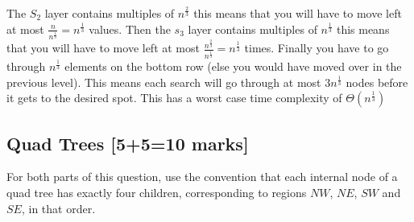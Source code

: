 \documentclass[12pt]{article}
\begin{document}
\begin{enumerate}
      The $S_2$ layer contains multiples of $n^{\frac{2}{3}}$ this means that you will have to move left at most $\frac{n}{n^{\frac{1}{3}}} = n^{\frac{1}{3}}$ values. Then the $s_3$ layer contains multiples of $n^{\frac{1}{3}}$ this means that you will have to move left at most $\frac{n^{\frac{2}{3}}}{n^{\frac{1}{3}}} = n^{\frac{1}{3}}$ times.
      Finally you have to go through $n^{\frac{1}{3}}$ elements on the bottom row (else you would have moved over in the previous level). This means each search will go through at most $3n^{\frac{1}{3}}$ nodes before it gets to the desired spot. This has a worst case time complexity of $\Theta(n^{\frac{1}{3}})$
\end{enumerate}

\subsection{Quad Trees [5+5=10 marks]}
For both parts of this question, use the convention that each
internal node of a quad tree has exactly four children, corresponding
to regions $NW$, $NE$, $SW$ and $SE$, in that order.
\end{document}
